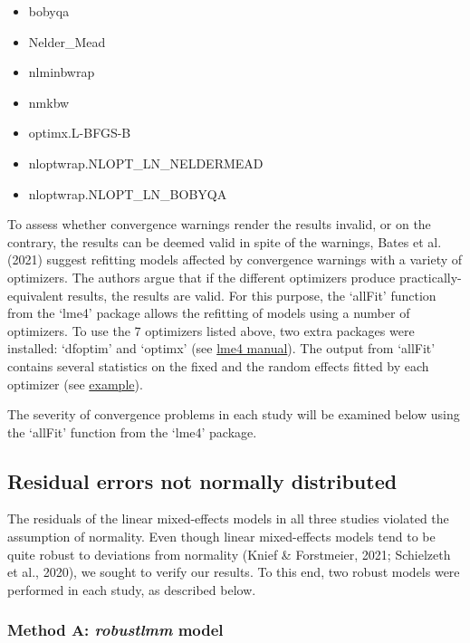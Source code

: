 \documentclass[
  12pt,
  man,floatsintext]{apa7}
\providecommand{\tightlist}{%
  \setlength{\itemsep}{0pt}\setlength{\parskip}{0pt}}
\begin{document}
\begin{itemize}
\tightlist
\item
  bobyqa
\item
  Nelder\_Mead
\item
  nlminbwrap
\item
  nmkbw
\item
  optimx.L-BFGS-B
\item
  nloptwrap.NLOPT\_LN\_NELDERMEAD
\item
  nloptwrap.NLOPT\_LN\_BOBYQA
\end{itemize}

To assess whether convergence warnings render the results invalid, or on the contrary, the results can be deemed valid in spite of the warnings, Bates et al. (2021) suggest refitting models affected by convergence warnings with a variety of optimizers. The authors argue that if the different optimizers produce practically-equivalent results, the results are valid. For this purpose, the `allFit' function from the `lme4' package allows the refitting of models using a number of optimizers. To use the 7 optimizers listed above, two extra packages were installed: `dfoptim' and `optimx' (see \href{https://cran.r-project.org/web/packages/lme4/lme4.pdf}{lme4 manual}). The output from `allFit' contains several statistics on the fixed and the random effects fitted by each optimizer (see \href{https://github.com/lme4/lme4/issues/512\#issue-425198940}{example}).

The severity of convergence problems in each study will be examined below using the `allFit' function from the `lme4' package.

\hypertarget{residual-errors-not-normally-distributed}{%
\subsection{Residual errors not normally distributed}\label{residual-errors-not-normally-distributed}}

The residuals of the linear mixed-effects models in all three studies violated the assumption of normality. Even though linear mixed-effects models tend to be quite robust to deviations from normality (Knief \& Forstmeier, 2021; Schielzeth et al., 2020), we sought to verify our results. To this end, two robust models were performed in each study, as described below.

\hypertarget{method-a-robustlmm-model}{%
\subsubsection{\texorpdfstring{Method A: \emph{robustlmm} model}{Method A: robustlmm model}}\label{method-a-robustlmm-model}}
\end{document}
